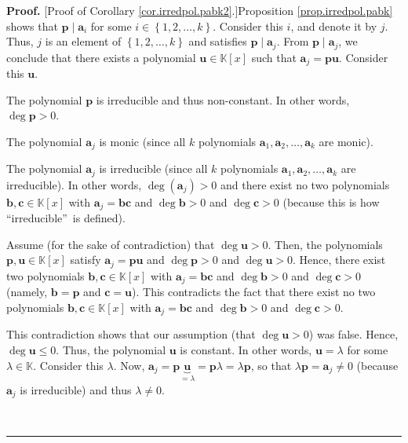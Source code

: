 \documentclass[numbers=enddot,12pt,final,onecolumn,notitlepage]{scrartcl}%
\theoremstyle{definition}
\newenvironment{proof}[1][Proof]{\noindent\textbf{#1.} }{\ \rule{0.5em}{0.5em}}
\begin{document}
\begin{proof}
[Proof of Corollary \ref{cor.irredpol.pabk2}.]Proposition
\ref{prop.irredpol.pabk} shows that $\mathbf{p}\mid\mathbf{a}_{i}$ for some
$i\in\left\{  1,2,\ldots,k\right\}  $. Consider this $i$, and denote it by
$j$. Thus, $j$ is an element of $\left\{  1,2,\ldots,k\right\}  $ and
satisfies $\mathbf{p}\mid\mathbf{a}_{j}$. From $\mathbf{p}\mid\mathbf{a}_{j}$,
we conclude that there exists a polynomial $\mathbf{u}\in\mathbb{K}\left[
x\right]  $ such that $\mathbf{a}_{j}=\mathbf{pu}$. Consider this $\mathbf{u}$.

The polynomial $\mathbf{p}$ is irreducible and thus non-constant. In other
words, $\deg\mathbf{p}>0$.

The polynomial $\mathbf{a}_{j}$ is monic (since all $k$ polynomials
$\mathbf{a}_{1},\mathbf{a}_{2},\ldots,\mathbf{a}_{k}$ are monic).

The polynomial $\mathbf{a}_{j}$ is irreducible (since all $k$ polynomials
$\mathbf{a}_{1},\mathbf{a}_{2},\ldots,\mathbf{a}_{k}$ are irreducible). In
other words, $\deg\left(  \mathbf{a}_{j}\right)  >0$ and there exist no two
polynomials $\mathbf{b},\mathbf{c}\in\mathbb{K}\left[  x\right]  $ with
$\mathbf{a}_{j}=\mathbf{bc}$ and $\deg\mathbf{b}>0$ and $\deg\mathbf{c}>0$
(because this is how \textquotedblleft irreducible\textquotedblright\ is defined).

Assume (for the sake of contradiction) that $\deg\mathbf{u}>0$. Then, the
polynomials $\mathbf{p},\mathbf{u}\in\mathbb{K}\left[  x\right]  $ satisfy
$\mathbf{a}_{j}=\mathbf{pu}$ and $\deg\mathbf{p}>0$ and $\deg\mathbf{u}>0$.
Hence, there exist two polynomials $\mathbf{b},\mathbf{c}\in\mathbb{K}\left[
x\right]  $ with $\mathbf{a}_{j}=\mathbf{bc}$ and $\deg\mathbf{b}>0$ and
$\deg\mathbf{c}>0$ (namely, $\mathbf{b}=\mathbf{p}$ and $\mathbf{c}%
=\mathbf{u}$). This contradicts the fact that there exist no two polynomials
$\mathbf{b},\mathbf{c}\in\mathbb{K}\left[  x\right]  $ with $\mathbf{a}%
_{j}=\mathbf{bc}$ and $\deg\mathbf{b}>0$ and $\deg\mathbf{c}>0$.

This contradiction shows that our assumption (that $\deg\mathbf{u}>0$) was
false. Hence, $\deg\mathbf{u}\leq0$. Thus, the polynomial $\mathbf{u}$ is
constant. In other words, $\mathbf{u}=\lambda$ for some $\lambda\in\mathbb{K}%
$. Consider this $\lambda$. Now, $\mathbf{a}_{j}=\mathbf{p}%
\underbrace{\mathbf{u}}_{=\lambda}=\mathbf{p}\lambda=\lambda\mathbf{p}$, so
that $\lambda\mathbf{p}=\mathbf{a}_{j}\neq0$ (because $\mathbf{a}_{j}$ is
irreducible) and thus $\lambda\neq0$.


\end{proof}
\end{document}
